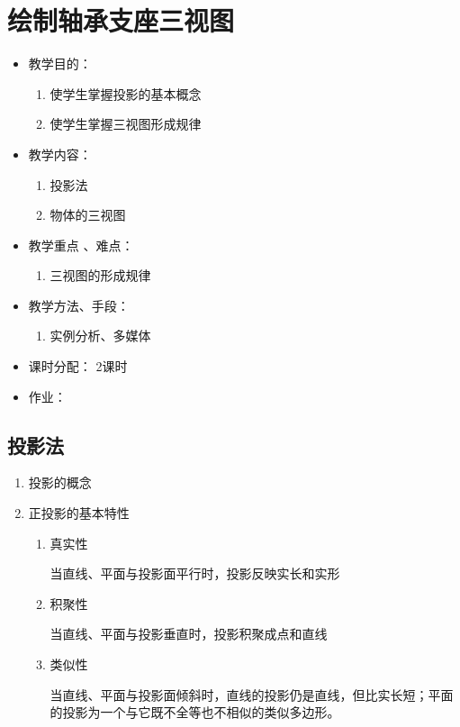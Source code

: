 \chapter{绘制轴承支座三视图}
\begin{itemize}
\item 教学目的：
\begin{enumerate}
\item 使学生掌握投影的基本概念
\item 使学生掌握三视图形成规律
\end{enumerate}
\item 教学内容：
\begin{enumerate}
\item 投影法
\item 物体的三视图
\end{enumerate}
\item 教学重点 、难点：
\begin{enumerate}
\item 三视图的形成规律
\end{enumerate}
\item 教学方法、手段：
\begin{enumerate}
\item 实例分析、多媒体
\end{enumerate}
\item 课时分配：
2课时
\item 作业：
\end{itemize}
\section{投影法}
\begin{enumerate}
\item 投影的概念
\item 正投影的基本特性
\begin{enumerate}
\item 真实性

当直线、平面与投影面平行时，投影反映实长和实形
\item 积聚性

当直线、平面与投影垂直时，投影积聚成点和直线
\item 类似性

当直线、平面与投影面倾斜时，直线的投影仍是直线，但比实长短；平面的投影为一个与它既不全等也不相似的类似多边形。
\end{enumerate}
\end{enumerate}
